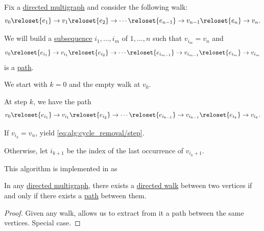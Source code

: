 \begin{algorithm}\label{alg:cycle_removal}
  Fix a \hyperref[def:hypergraph/multigraph]{directed multigraph} and consider the following walk:
  \begin{equation}\label{eq:alg:cycle_removal/src}
    v_0 \reloset {e_1} \to v_1 \reloset {e_2} \to \cdots \reloset {e_{n-1}} \to v_{n-1} \reloset {e_n} \to v_n.
  \end{equation}

  We will build a \hyperref[def:subsequence]{subsequence} \( i_1, \ldots, i_m \) of \( 1, \ldots, n \) such that \( v_{i_m} = v_n \) and
  \begin{equation}\label{eq:alg:cycle_removal/dest}
    v_0 \reloset {e_{i_1}} \to v_{i_1} \reloset {e_{i_2}} \to \cdots \reloset {e_{i_{m-1}}} \to v_{i_{m-1}} \reloset {e_{i_m}} \to v_{i_m}
  \end{equation}
  is a \hyperref[def:graph_walk/path]{path}.

  \begin{thmenum}
     We start with \( k = 0 \) and the empty walk at \( v_0 \).

     At step \( k \), we have the path
    \begin{equation}\label{eq:alg:cycle_removal/step}
      v_0 \reloset {e_{i_1}} \to v_{i_1} \reloset {e_{i_2}} \to \cdots \reloset {e_{i_{k-1}}} \to v_{i_{k-1}} \reloset {e_{i_k}} \to v_{i_k}.
    \end{equation}

    \begin{thmenum}
       If \( v_{i_k} = v_n \), yield \eqref{eq:alg:cycle_removal/step}.

       Otherwise, let \( i_{k+1} \) be the index of the last occurrence of \( v_{i_k + 1} \).
    \end{thmenum}
  \end{thmenum}
\end{algorithm}
\begin{comments}
  \item This algorithm is implemented in \cite{notebook:code} as
  \begin{CodeRefDisplay}
  \end{CodeRefDisplay}
\end{comments}

\begin{proposition}\label{thm:path_iff_walk}
  In any \hyperref[def:hypergraph/multigraph]{directed multigraph}, there exists a \hyperref[def:graph_walk/directed]{directed walk} between two vertices if and only if there exists a \hyperref[def:graph_walk/path]{path} between them.
\end{proposition}
\begin{proof}
  \SufficiencySubProof Given any walk,  allows us to extract from it a path between the same vertices.
  \NecessitySubProof Special case.
\end{proof}

